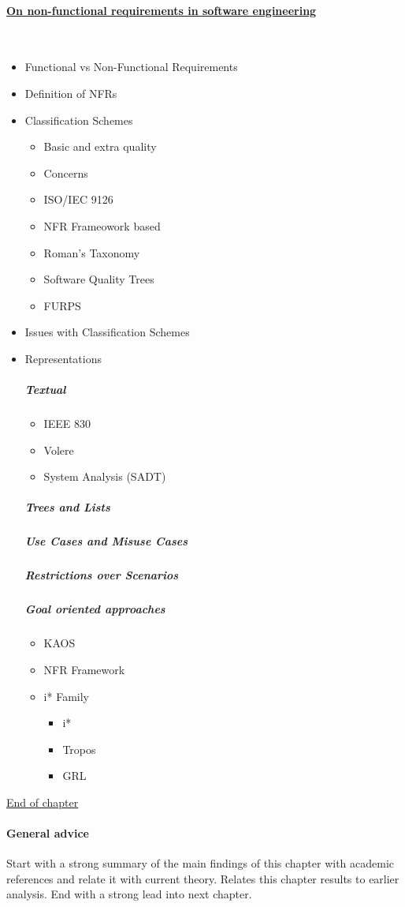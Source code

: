 \documentclass[dissertation]{softeng}
\begin{document}
\paragraph*{\underline{On non-functional requirements in software engineering}}~\cite{Chung:2009vg}
\begin{itemize}
\item Functional vs Non-Functional Requirements
\item Definition of NFRs
\item{Classification Schemes}
\begin{itemize}
\item Basic and extra quality
\item Concerns
\item ISO/IEC 9126
\item NFR Frameowork based
\item Roman's Taxonomy
\item Software Quality Trees
\item FURPS
\end{itemize}
\item Issues with Classification Schemes
\item{Representations}
\subparagraph{Textual}
\begin{itemize}
\item IEEE 830
\item Volere
\item System Analysis (SADT)
\end{itemize}
\subparagraph{Trees and Lists}
\subparagraph{Use Cases and Misuse Cases}
\subparagraph{Restrictions over Scenarios}
\subparagraph{Goal oriented approaches}
\begin{itemize}
\item KAOS
\item NFR Framework
\item{i* Family}
\begin{itemize}
\item i*
\item Tropos
\item GRL
\end{itemize}
\end{itemize}
\end{itemize}

\underline{End of chapter}
\paragraph{General advice}
Start with a strong summary of the main findings of this chapter with academic references and relate it with current theory.
Relates this chapter results to earlier analysis.
End with a strong lead into next chapter.
\end{document}
